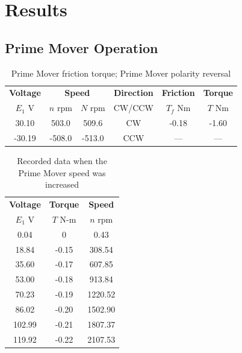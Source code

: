 \documentclass{article}
\begin{document}
\section{Results}

\subsection{Prime Mover Operation}

\begin{table}[H]
  \centering
  \begin{tabular}{*{6}{c}}
    \textbf{Voltage} & \multicolumn{2}{c}{\textbf{Speed}} & \textbf{Direction}
    & \textbf{Friction} & \textbf{Torque} \\
    $E_1$ V & $n$ rpm & $N$ rpm & CW/CCW & $T_f$ Nm & $T$ Nm \\
    \hline
     30.10 &  503.0 &  509.6 &  CW & -0.18 & -1.60 \\
    -30.19 & -508.0 & -513.0 & CCW &   --- &   --- \\
  \end{tabular}
  \caption{Prime Mover friction torque; Prime Mover polarity reversal}
  \label{tab:table_01}
\end{table}

\begin{table}[H]
  \centering
  \begin{tabular}{*{3}{c}}
    \textbf{Voltage} & \textbf{Torque} & \textbf{Speed} \\
    $E_1$ V          & $T$ N-m         & $n$ rpm \\

    \hline

      0.04 &     0 &    0.43 \\
     18.84 & -0.15 &  308.54 \\
     35.60 & -0.17 &  607.85 \\
     53.00 & -0.18 &  913.84 \\
     70.23 & -0.19 & 1220.52 \\
     86.02 & -0.20 & 1502.90 \\
    102.99 & -0.21 & 1807.37 \\
    119.92 & -0.22 & 2107.53 \\
  \end{tabular}
  \caption{Recorded data when the Prime Mover speed was increased}
  \label{tab:table_02}
\end{table}
\end{document}
